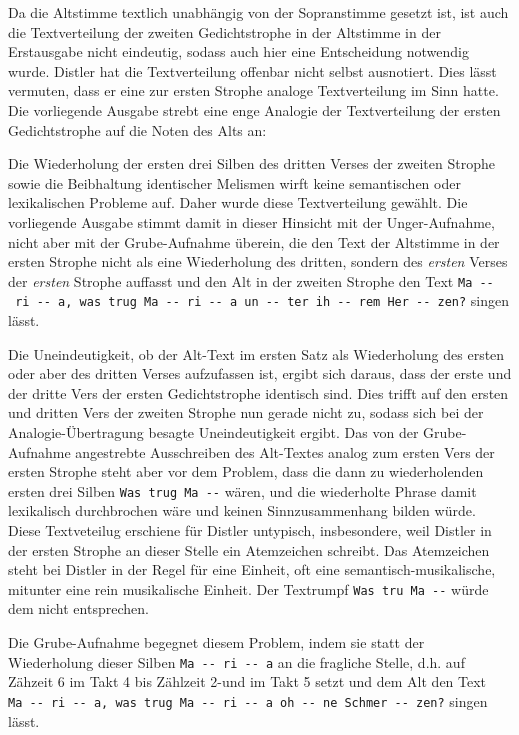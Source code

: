 \documentclass[a4paper]{book}
\begin{document}
\begin{multicols}{2}
Da die Altstimme textlich unabhängig von der Sopranstimme gesetzt ist,
ist auch die Textverteilung der zweiten Gedichtstrophe in der Altstimme
in der Erstausgabe nicht eindeutig, sodass auch hier eine Entscheidung
notwendig wurde. Distler hat die Textverteilung offenbar nicht selbst
ausnotiert. Dies lässt vermuten, dass er eine zur ersten Strophe analoge
Textverteilung im Sinn hatte. Die vorliegende Ausgabe strebt eine enge
Analogie der Textverteilung der ersten Gedichtstrophe auf die Noten des
Alts an:

Die Wiederholung der ersten drei Silben des dritten Verses der zweiten
Strophe sowie die Beibhaltung identischer Melismen wirft keine
semantischen oder lexikalischen Probleme auf. Daher wurde diese
Textverteilung gewählt. Die vorliegende Ausgabe stimmt damit in dieser
Hinsicht mit der Unger-Aufnahme, nicht aber mit der Grube-Aufnahme
überein, die den Text der Altstimme in der ersten Strophe nicht als eine
Wiederholung des dritten, sondern des \emph{ersten} Verses der
\emph{ersten} Strophe auffasst und den Alt in der zweiten Strophe den
Text
\texttt{Ma\ -\/-\ ri\ -\/-\ a,\ was\ trug\ Ma\ -\/-\ ri\ -\/-\ a\ un\ -\/-\ ter\ ih\ -\/-\ rem\ Her\ -\/-\ zen?}
singen lässt.

Die Uneindeutigkeit, ob der Alt-Text im ersten Satz als Wiederholung des
ersten oder aber des dritten Verses aufzufassen ist, ergibt sich daraus,
dass der erste und der dritte Vers der ersten Gedichtstrophe identisch
sind. Dies trifft auf den ersten und dritten Vers der zweiten Strophe
nun gerade nicht zu, sodass sich bei der Analogie-Übertragung besagte
Uneindeutigkeit ergibt. Das von der Grube-Aufnahme angestrebte
Ausschreiben des Alt-Textes analog zum ersten Vers der ersten Strophe
steht aber vor dem Problem, dass die dann zu wiederholenden ersten drei
Silben \texttt{Was\ trug\ Ma\ -\/-} wären, und die wiederholte Phrase
damit lexikalisch durchbrochen wäre und keinen Sinnzusammenhang bilden
würde. Diese Textveteilug erschiene für Distler untypisch, insbesondere,
weil Distler in der ersten Strophe an dieser Stelle ein Atemzeichen
schreibt. Das Atemzeichen steht bei Distler in der Regel für eine
Einheit, oft eine semantisch-musikalische, mitunter eine rein
musikalische Einheit. Der Textrumpf \texttt{Was\ tru\ Ma\ -\/-} würde
dem nicht entsprechen.

Die Grube-Aufnahme begegnet diesem Problem, indem sie statt der
Wiederholung dieser Silben \texttt{Ma\ -\/-\ ri\ -\/-\ a} an die
fragliche Stelle, d.h. auf Zähzeit 6 im Takt 4 bis Zählzeit 2-und im
Takt 5 setzt und dem Alt den Text
\texttt{Ma\ -\/-\ ri\ -\/-\ a,\ was\ trug\ Ma\ -\/-\ ri\ -\/-\ a\ oh\ -\/-\ ne\ Schmer\ -\/-\ zen?}
singen lässt.


\end{multicols}
\end{document}
